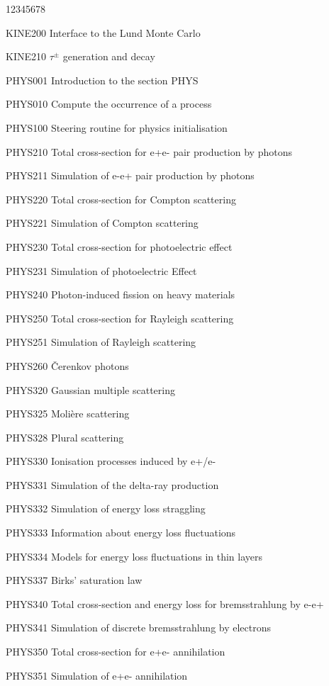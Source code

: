 \begin{DLtt}{12345678}
\item[KINE200] Interface to the Lund Monte Carlo
\item[KINE210] $\tau ^{\pm }$ generation and decay
\item[PHYS001] Introduction to the section PHYS
\item[PHYS010] Compute the occurrence of a process
\item[PHYS100] Steering routine for physics initialisation
\item[PHYS210] Total cross-section for e+e- pair production by photons
\item[PHYS211] Simulation of e-e+ pair production by photons
\item[PHYS220] Total cross-section for Compton scattering
\item[PHYS221] Simulation of Compton scattering
\item[PHYS230] Total cross-section for photoelectric effect
\item[PHYS231] Simulation of photoelectric Effect
\item[PHYS240] Photon-induced fission on heavy materials
\item[PHYS250] Total cross-section for Rayleigh scattering
\item[PHYS251] Simulation of Rayleigh scattering
\item[PHYS260] \v{C}erenkov photons
\item[PHYS320] Gaussian multiple scattering
\item[PHYS325] Moli\`ere scattering
\item[PHYS328] Plural scattering
\item[PHYS330] Ionisation processes induced by e+/e-
\item[PHYS331] Simulation of the delta-ray production
\item[PHYS332] Simulation of energy loss straggling
\item[PHYS333] Information about energy loss fluctuations
\item[PHYS334] Models for energy loss fluctuations in thin layers
\item[PHYS337] Birks' saturation law
\item[PHYS340] Total cross-section and energy loss for bremsstrahlung by e-e+
\item[PHYS341] Simulation of discrete bremsstrahlung by electrons
\item[PHYS350] Total cross-section for e+e- annihilation
\item[PHYS351] Simulation of e+e- annihilation

\end{DLtt}
